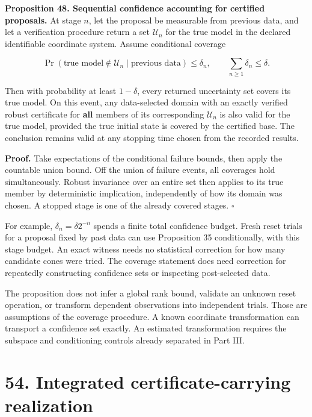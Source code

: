 \documentclass[11pt,letterpaper]{article}
\begin{document}
\textbf{Proposition 48. Sequential confidence accounting for certified
proposals.} At stage \(n\), let the proposal be measurable from previous
data, and let a verification procedure return a set \(\mathcal U_n\) for
the true model in the declared identifiable coordinate system. Assume
conditional coverage

\[
\Pr(\text{true model}\notin\mathcal U_n\mid\text{previous data})
\leq\delta_n,
\qquad\sum_{n\geq1}\delta_n\leq\delta.
\]

Then with probability at least \(1-\delta\), every returned uncertainty
set covers its true model. On this event, any data-selected domain with
an exactly verified robust certificate for \textbf{all} members of its
corresponding \(\mathcal U_n\) is also valid for the true model,
provided the true initial state is covered by the certified base. The
conclusion remains valid at any stopping time chosen from the recorded
results.

\textbf{Proof.} Take expectations of the conditional failure bounds,
then apply the countable union bound. Off the union of failure events,
all coverages hold simultaneously. Robust invariance over an entire set
then applies to its true member by deterministic implication,
independently of how its domain was chosen. A stopped stage is one of
the already covered stages. \(\square\)

For example, \(\delta_n=\delta 2^{-n}\) spends a finite total confidence
budget. Fresh reset trials for a proposal fixed by past data can use
Proposition 35 conditionally, with this stage budget. An exact witness
needs no statistical correction for how many candidate cones were tried.
The coverage statement does need correction for repeatedly constructing
confidence sets or inspecting post-selected data.

The proposition does not infer a global rank bound, validate an unknown
reset operation, or transform dependent observations into independent
trials. Those are assumptions of the coverage procedure. A known
coordinate transformation can transport a confidence set exactly. An
estimated transformation requires the subspace and conditioning controls
already separated in Part III.

\section{54. Integrated certificate-carrying
realization}\label{integrated-certificate-carrying-realization}
\end{document}
